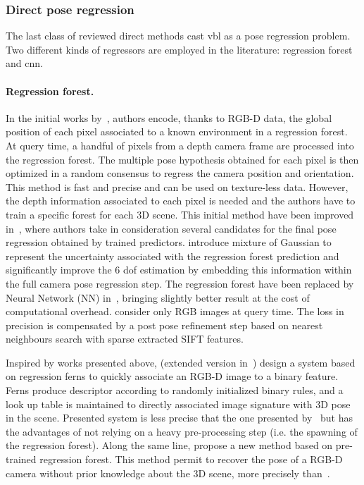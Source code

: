 \subsubsection{Direct pose regression}
\label{subsubsec:pose_regression}
The last class of reviewed direct methods cast \ac{vbl} as a pose regression problem. Two different kinds of regressors are employed in the literature: regression forest and \ac{cnn}.

\paragraph{Regression forest.}
In the initial works by~\citet{Shotton2013}, authors encode, thanks to RGB-D data, the global position of each pixel associated to a known environment in a regression forest. At query time, a handful of pixels from a depth camera frame are processed into the regression forest. The multiple pose hypothesis obtained for each pixel is then optimized in a random consensus to regress the camera position and orientation. This method is fast and precise and can be used on texture-less data. However, the depth information associated to each pixel is needed and the authors have to train a specific forest for each 3D scene. This initial method have been improved in~\citep{Guzman-rivera2014}, where authors take in consideration several candidates for the final pose regression obtained by trained predictors. \citet{Valentin2015} introduce mixture of Gaussian to represent the uncertainty associated with the regression forest prediction and significantly improve the 6 \ac{dof} estimation by embedding this information within the full camera pose regression step. The regression forest have been replaced by Neural Network (NN) in~\citep{Massiceti2016}, bringing slightly better result at the cost of computational overhead. \citet{Meng2016} consider only RGB images at query time. The loss in precision is compensated by a post pose refinement step based on nearest neighbours search with sparse extracted SIFT features.

Inspired by works presented above, \citet{Glocker2013} (extended version in~\citep{Glocker2015}) design a system based on regression ferns to quickly associate an RGB-D image to a binary feature. Ferns produce descriptor according to randomly initialized binary rules, and a look up table is maintained to directly associated image signature with 3D pose in the scene. Presented system is less precise that the one presented by~\citet{Shotton2013} but has the advantages of not relying on a heavy pre-processing step (i.e. the spawning of the regression forest). Along the same line, \citet{Cavallari} propose a new method based on pre-trained regression forest. This method permit to recover the pose of a RGB-D camera without prior knowledge about the 3D scene, more precisely than~\citet{Glocker2013,Glocker2015}.


